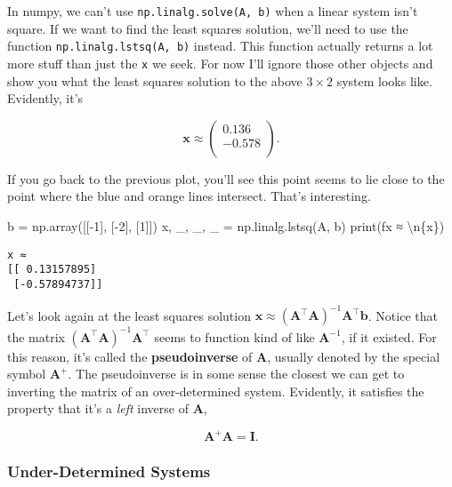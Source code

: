 \documentclass[
  letterpaper,
  DIV=11,
  numbers=noendperiod]{scrreprt}
\newenvironment{Shaded}{\begin{snugshade}}{\end{snugshade}}
\newcommand{\BuiltInTok}[1]{\textcolor[rgb]{0.00,0.23,0.31}{#1}}
\newcommand{\CharTok}[1]{\textcolor[rgb]{0.13,0.47,0.30}{#1}}
\newcommand{\DecValTok}[1]{\textcolor[rgb]{0.68,0.00,0.00}{#1}}
\newcommand{\NormalTok}[1]{\textcolor[rgb]{0.00,0.23,0.31}{#1}}
\newcommand{\OperatorTok}[1]{\textcolor[rgb]{0.37,0.37,0.37}{#1}}
\newcommand{\SpecialCharTok}[1]{\textcolor[rgb]{0.37,0.37,0.37}{#1}}
\newcommand{\SpecialStringTok}[1]{\textcolor[rgb]{0.13,0.47,0.30}{#1}}
\begin{document}
In numpy, we can't use \texttt{np.linalg.solve(A,\ b)} when a linear
system isn't square. If we want to find the least squares solution,
we'll need to use the function \texttt{np.linalg.lstsq(A,\ b)} instead.
This function actually returns a lot more stuff than just the \texttt{x}
we seek. For now I'll ignore those other objects and show you what the
least squares solution to the above \(3 \times 2\) system looks like.
Evidently, it's

\[
\mathbf{x} \approx 
\begin{pmatrix}
0.136 \\
-0.578 \\
\end{pmatrix}.
\]

If you go back to the previous plot, you'll see this point seems to lie
close to the point where the blue and orange lines intersect. That's
interesting.

\begin{Shaded}
\begin{Highlighting}[]
\NormalTok{b }\OperatorTok{=}\NormalTok{ np.array([[}\OperatorTok{{-}}\DecValTok{1}\NormalTok{], [}\OperatorTok{{-}}\DecValTok{2}\NormalTok{], [}\DecValTok{1}\NormalTok{]])}
\NormalTok{x, \_, \_, \_ }\OperatorTok{=}\NormalTok{ np.linalg.lstsq(A, b)}
\BuiltInTok{print}\NormalTok{(}\SpecialStringTok{f\textquotesingle{}x ≈ }\CharTok{\textbackslash{}n}\SpecialCharTok{\{}\NormalTok{x}\SpecialCharTok{\}}\SpecialStringTok{\textquotesingle{}}\NormalTok{)}
\end{Highlighting}
\end{Shaded}

\begin{verbatim}
x ≈ 
[[ 0.13157895]
 [-0.57894737]]
\end{verbatim}

Let's look again at the least squares solution
\(\mathbf{x} \approx (\mathbf{A}^\top \mathbf{A})^{-1} \mathbf{A}^\top \mathbf{b}\).
Notice that the matrix
\((\mathbf{A}^\top \mathbf{A})^{-1} \mathbf{A}^\top\) seems to function
kind of like \(\mathbf{A}^{-1}\), if it existed. For this reason, it's
called the \textbf{pseudoinverse} of \(\mathbf{A}\), usually denoted by
the special symbol \(\mathbf{A}^+\). The pseudoinverse is in some sense
the closest we can get to inverting the matrix of an over-determined
system. Evidently, it satisfies the property that it's a \emph{left}
inverse of \(\mathbf{A}\),

\[\mathbf{A}^+ \mathbf{A} = \mathbf{I}.\]

\hypertarget{under-determined-systems}{%
\subsubsection{Under-Determined
Systems}\label{under-determined-systems}}
\end{document}
